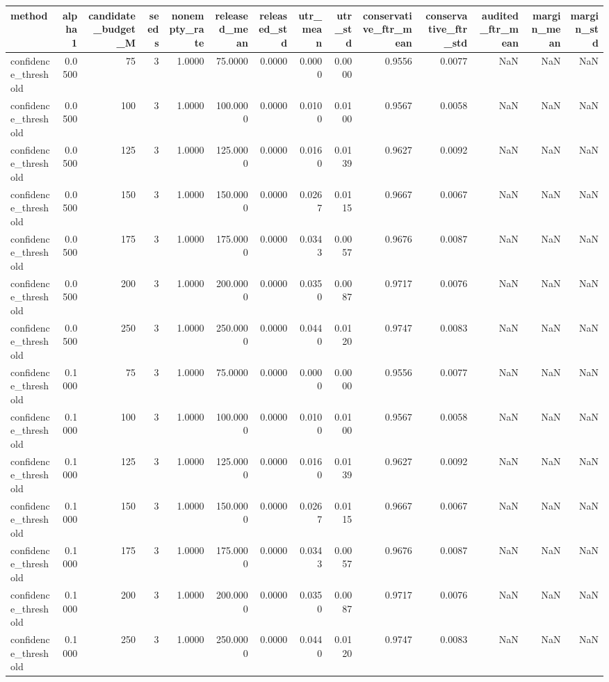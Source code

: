 \begin{tabular}{lrrrrrrrrrrrrr}
\toprule
method & alpha1 & candidate_budget_M & seeds & nonempty_rate & released_mean & released_std & utr_mean & utr_std & conservative_ftr_mean & conservative_ftr_std & audited_ftr_mean & margin_mean & margin_std \\
\midrule
confidence_threshold & 0.0500 & 75 & 3 & 1.0000 & 75.0000 & 0.0000 & 0.0000 & 0.0000 & 0.9556 & 0.0077 & NaN & NaN & NaN \\
confidence_threshold & 0.0500 & 100 & 3 & 1.0000 & 100.0000 & 0.0000 & 0.0100 & 0.0100 & 0.9567 & 0.0058 & NaN & NaN & NaN \\
confidence_threshold & 0.0500 & 125 & 3 & 1.0000 & 125.0000 & 0.0000 & 0.0160 & 0.0139 & 0.9627 & 0.0092 & NaN & NaN & NaN \\
confidence_threshold & 0.0500 & 150 & 3 & 1.0000 & 150.0000 & 0.0000 & 0.0267 & 0.0115 & 0.9667 & 0.0067 & NaN & NaN & NaN \\
confidence_threshold & 0.0500 & 175 & 3 & 1.0000 & 175.0000 & 0.0000 & 0.0343 & 0.0057 & 0.9676 & 0.0087 & NaN & NaN & NaN \\
confidence_threshold & 0.0500 & 200 & 3 & 1.0000 & 200.0000 & 0.0000 & 0.0350 & 0.0087 & 0.9717 & 0.0076 & NaN & NaN & NaN \\
confidence_threshold & 0.0500 & 250 & 3 & 1.0000 & 250.0000 & 0.0000 & 0.0440 & 0.0120 & 0.9747 & 0.0083 & NaN & NaN & NaN \\
confidence_threshold & 0.1000 & 75 & 3 & 1.0000 & 75.0000 & 0.0000 & 0.0000 & 0.0000 & 0.9556 & 0.0077 & NaN & NaN & NaN \\
confidence_threshold & 0.1000 & 100 & 3 & 1.0000 & 100.0000 & 0.0000 & 0.0100 & 0.0100 & 0.9567 & 0.0058 & NaN & NaN & NaN \\
confidence_threshold & 0.1000 & 125 & 3 & 1.0000 & 125.0000 & 0.0000 & 0.0160 & 0.0139 & 0.9627 & 0.0092 & NaN & NaN & NaN \\
confidence_threshold & 0.1000 & 150 & 3 & 1.0000 & 150.0000 & 0.0000 & 0.0267 & 0.0115 & 0.9667 & 0.0067 & NaN & NaN & NaN \\
confidence_threshold & 0.1000 & 175 & 3 & 1.0000 & 175.0000 & 0.0000 & 0.0343 & 0.0057 & 0.9676 & 0.0087 & NaN & NaN & NaN \\
confidence_threshold & 0.1000 & 200 & 3 & 1.0000 & 200.0000 & 0.0000 & 0.0350 & 0.0087 & 0.9717 & 0.0076 & NaN & NaN & NaN \\
confidence_threshold & 0.1000 & 250 & 3 & 1.0000 & 250.0000 & 0.0000 & 0.0440 & 0.0120 & 0.9747 & 0.0083 & NaN & NaN & NaN \\

\end{tabular}
